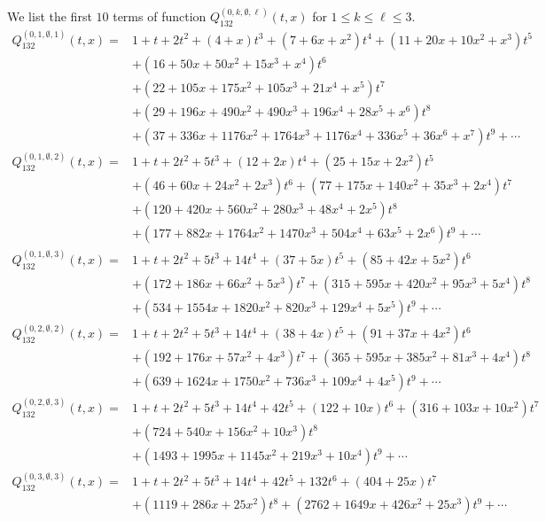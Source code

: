 \documentclass[
final,nomarks
]{dmtcs-episciences}
\newcommand{\Qmm}[1]{Q_{132}^{(#1)}(t,x)}
\begin{document}
We list the first \begin{math}10\end{math} terms of function \begin{math}\Qmm{0,k,\emptyset,\ell}\end{math} for \begin{math}1\leq k\leq \ell\leq 3\end{math}.
\begin{align}
\Qmm{0,1,\emptyset,1}=&1+t+2 t^2+(4+x) t^3+\left(7+6 x+x^2\right) t^4+\left(11+20 x+10 x^2+x^3\right)
t^5\nonumber\\\nonumber
&+\left(16+50 x+50 x^2+15 x^3+x^4\right) t^6\\\nonumber
&+\left(22+105 x+175 x^2+105
x^3+21 x^4+x^5\right) t^7\\\nonumber
&+\left(29+196 x+490 x^2+490 x^3+196 x^4+28
x^5+x^6\right) t^8\\
&+\left(37+336 x+1176 x^2+1764 x^3+1176 x^4+336 x^5+36
x^6+x^7\right) t^9+\cdots
\\
\Qmm{0,1,\emptyset,2}=&1+t+2 t^2+5 t^3+(12+2 x) t^4+\left(25+15 x+2 x^2\right) t^5\nonumber\\\nonumber
&+\left(46+60 x+24
x^2+2 x^3\right) t^6+\left(77+175 x+140 x^2+35 x^3+2 x^4\right)t^7\\\nonumber
&+\left(120+420 x+560 x^2+280 x^3+48 x^4+2 x^5\right) t^8\\
&+\left(177+882
x+1764 x^2+1470 x^3+504 x^4+63 x^5+2 x^6\right) t^9+\cdots
\\
\Qmm{0,1,\emptyset,3}=&1+t+2 t^2+5 t^3+14 t^4+(37+5 x) t^5+\left(85+42 x+5 x^2\right)
t^6\nonumber\\\nonumber
&+\left(172+186 x+66 x^2+5 x^3\right) t^7+\left(315+595 x+420 x^2+95 x^3+5
x^4\right) t^8\\
&+\left(534+1554 x+1820 x^2+820 x^3+129 x^4+5 x^5\right)
t^9+\cdots
\\
\Qmm{0,2,\emptyset,2}=&1+t+2 t^2+5 t^3+14 t^4+(38+4 x) t^5+\left(91+37 x+4 x^2\right)
t^6\nonumber\\\nonumber
&+\left(192+176 x+57 x^2+4 x^3\right) t^7+\left(365+595 x+385 x^2+81 x^3+4
x^4\right) t^8\\
&+\left(639+1624 x+1750 x^2+736 x^3+109 x^4+4 x^5\right)
t^9+\cdots
\\
\Qmm{0,2,\emptyset,3}=&1+t+2 t^2+5 t^3+14 t^4+42 t^5+(122+10 x) t^6+\left(316+103 x+10 x^2\right)
t^7\nonumber\\\nonumber
&+\left(724+540 x+156 x^2+10 x^3\right) t^8\\
&+\left(1493+1995 x+1145 x^2+219
x^3+10 x^4\right) t^9+\cdots
\\
\Qmm{0,3,\emptyset,3}=&1+t+2 t^2+5 t^3+14 t^4+42 t^5+132 t^6+(404+25 x) t^7\nonumber\\
&+\left(1119+286 x+25
x^2\right) t^8+\left(2762+1649 x+426 x^2+25 x^3\right)
t^9+\cdots
\end{align}
\end{document}
